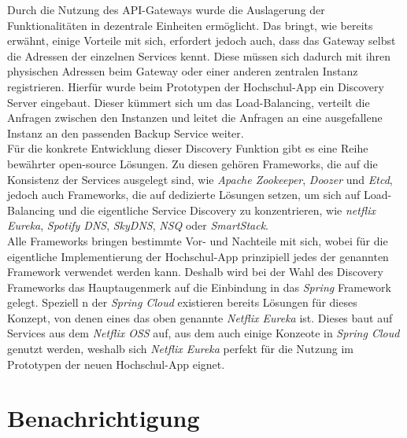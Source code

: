 Durch die Nutzung des \ac{API}-Gateways wurde die Auslagerung der Funktionalitäten in dezentrale Einheiten ermöglicht. Das bringt, wie bereits erwähnt, einige Vorteile mit sich, erfordert jedoch auch, dass das Gateway selbst die Adressen der einzelnen Services kennt. Diese müssen sich dadurch mit ihren physischen Adressen beim Gateway oder einer anderen zentralen Instanz registrieren. Hierfür wurde beim Prototypen der Hochschul-\ac{App} ein Discovery Server eingebaut. Dieser kümmert sich um das Load-Balancing, verteilt die Anfragen zwischen den Instanzen und leitet die Anfragen an eine ausgefallene Instanz an den passenden Backup Service weiter.\\
\linebreak
Für die konkrete Entwicklung dieser Discovery Funktion gibt es eine Reihe bewährter open-source Lösungen. Zu diesen gehören Frameworks, die auf die Konsistenz der Services ausgelegt sind, wie \textit{Apache Zookeeper}, \textit{Doozer} und \textit{Etcd}, jedoch auch Frameworks, die auf dedizierte Lösungen setzen, um sich auf Load-Balancing und die eigentliche Service Discovery zu konzentrieren, wie \textit{netflix Eureka}, \textit{Spotify DNS}, \textit{SkyDNS}, \textit{NSQ} oder \textit{SmartStack}\autocite[][]{cloud_discovery}.
\\
\linebreak
Alle Frameworks bringen bestimmte Vor- und Nachteile mit sich, wobei für die eigentliche Implementierung der Hochschul-\ac{App} prinzipiell jedes der genannten Framework verwendet werden kann. Deshalb wird bei der Wahl des Discovery Frameworks das Hauptaugenmerk auf die Einbindung in das \textit{Spring} Framework gelegt. Speziell n der \textit{Spring Cloud} existieren bereits Lösungen für dieses Konzept, von denen eines das oben genannte \textit{Netflix Eureka} ist. Dieses baut auf Services aus dem \textit{Netflix \ac{OSS}} auf, aus dem auch einige Konzeote in \textit{Spring Cloud} genutzt werden, weshalb sich \textit{Netflix Eureka} perfekt für die Nutzung im Prototypen der neuen Hochschul-\ac{App} eignet.

\section{Benachrichtigung}
\label{sec:notification}

